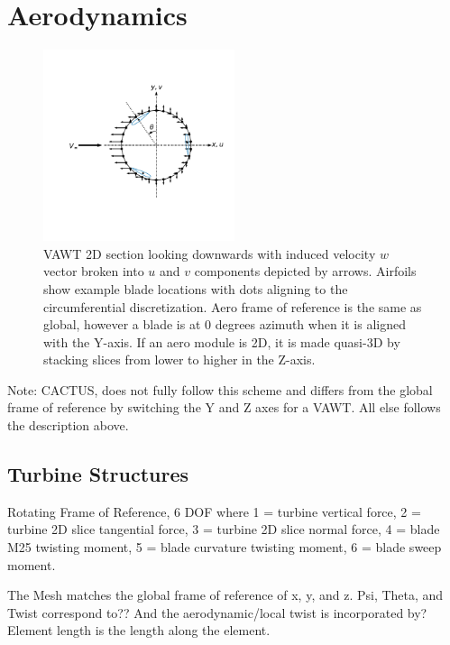 \documentclass[11pt]{article}
\begin{document}
\section{Aerodynamics}

\begin{figure}[H]
\centering
\vspace{-12pt}
\includegraphics[trim={1.3cm 2.4cm .5cm 1.5cm},clip,width=0.5\textwidth]{../figs/vawt_slice}
\vspace{-12pt}
\caption{VAWT 2D section looking downwards with induced velocity \(w\) vector broken into \(u\) and \(v\) components depicted by arrows. Airfoils show example blade locations with dots aligning to the circumferential discretization.  Aero frame of reference is the same as global, however a blade is at 0 degrees azimuth when it is aligned with the Y-axis.  If an aero module is 2D, it is made quasi-3D by stacking slices from lower to higher in the Z-axis.}
\label{fig:ac_velocities}
\end{figure}

Note: CACTUS, does not fully follow this scheme and differs from the global frame of reference by switching the Y and Z axes for a VAWT.  All else follows the description above.

\subsection{Turbine Structures}

Rotating Frame of Reference, 6 DOF where 1 = turbine vertical force, 2 = turbine 2D slice tangential force, 3 = turbine 2D slice normal force, 4 = blade M25 twisting moment, 5 = blade curvature twisting moment, 6 = blade sweep moment.

The Mesh matches the global frame of reference of x, y, and z.  Psi, Theta, and Twist correspond to??  And the aerodynamic/local twist is incorporated by?  Element length is the length along the element.
\end{document}
